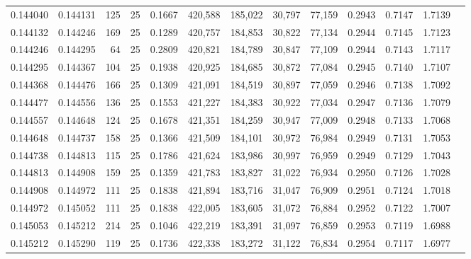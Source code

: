 \begin{tabular}{rrrrrrrrrrrrr}
0.144040 & 0.144131 &   125 &  25 &                                     0.1667 & 420,588 & 185,022 &  30,797 &  77,159 & 0.2943 & 0.7147 & 1.7139 \\
0.144132 & 0.144246 &   169 &  25 &                                     0.1289 & 420,757 & 184,853 &  30,822 &  77,134 & 0.2944 & 0.7145 & 1.7123 \\
0.144246 & 0.144295 &    64 &  25 &                                     0.2809 & 420,821 & 184,789 &  30,847 &  77,109 & 0.2944 & 0.7143 & 1.7117 \\
0.144295 & 0.144367 &   104 &  25 &                                     0.1938 & 420,925 & 184,685 &  30,872 &  77,084 & 0.2945 & 0.7140 & 1.7107 \\
0.144368 & 0.144476 &   166 &  25 &                                     0.1309 & 421,091 & 184,519 &  30,897 &  77,059 & 0.2946 & 0.7138 & 1.7092 \\
0.144477 & 0.144556 &   136 &  25 &                                     0.1553 & 421,227 & 184,383 &  30,922 &  77,034 & 0.2947 & 0.7136 & 1.7079 \\
0.144557 & 0.144648 &   124 &  25 &                                     0.1678 & 421,351 & 184,259 &  30,947 &  77,009 & 0.2948 & 0.7133 & 1.7068 \\
0.144648 & 0.144737 &   158 &  25 &                                     0.1366 & 421,509 & 184,101 &  30,972 &  76,984 & 0.2949 & 0.7131 & 1.7053 \\
0.144738 & 0.144813 &   115 &  25 &                                     0.1786 & 421,624 & 183,986 &  30,997 &  76,959 & 0.2949 & 0.7129 & 1.7043 \\
0.144813 & 0.144908 &   159 &  25 &                                     0.1359 & 421,783 & 183,827 &  31,022 &  76,934 & 0.2950 & 0.7126 & 1.7028 \\
0.144908 & 0.144972 &   111 &  25 &                                     0.1838 & 421,894 & 183,716 &  31,047 &  76,909 & 0.2951 & 0.7124 & 1.7018 \\
0.144972 & 0.145052 &   111 &  25 &                                     0.1838 & 422,005 & 183,605 &  31,072 &  76,884 & 0.2952 & 0.7122 & 1.7007 \\
0.145053 & 0.145212 &   214 &  25 &                                     0.1046 & 422,219 & 183,391 &  31,097 &  76,859 & 0.2953 & 0.7119 & 1.6988 \\
0.145212 & 0.145290 &   119 &  25 &                                     0.1736 & 422,338 & 183,272 &  31,122 &  76,834 & 0.2954 & 0.7117 & 1.6977 \\

\end{tabular}
